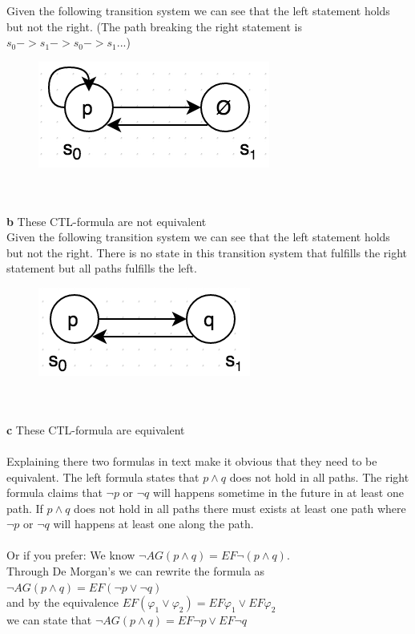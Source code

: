 \documentclass[12pt,oneside,reqno]{amsart}
\begin{document}
Given the following transition system we can see that the left statement holds but not the right. (The path breaking the right statement is $s_0->s_1->s_0->s_1...$)
	\begin{figure}[h]
      	\includegraphics[scale=0.7]{prob3a}
	\end{figure}\\\\
\textbf{b} These CTL-formula are not equivalent\\
Given the following transition system we can see that the left statement holds but not the right. There is no state in this transition system that fulfills the right statement but all paths fulfills the left.
	\begin{figure}[h]
      	\includegraphics[scale=0.7]{prob3b}
	\end{figure}\\\\
\textbf{c} These CTL-formula are equivalent\\\\
Explaining there two formulas in text make it obvious that they need to be equivalent. The left formula states that $p \land q$ does not hold in all paths. The right formula claims that $\neg p$ or $\neg q$ will happens sometime in the future in at least one path. If $p \land q$ does not hold in all paths there must exists at least one path where $\neg p$ or $\neg q$ will happens at least one along the path.\\\\
Or if you prefer:
We know $\neg AG(p \land q) = EF\neg(p \land q)$.\\
Through De Morgan's we can rewrite the formula as $\neg AG(p\land q) = EF(\neg p \lor \neg q)$\\
and by the equivalence $EF(\varphi_1 \lor \varphi_2)=EF\varphi_1 \lor EF\varphi_2$\\ we can state that $\neg AG(p\land q) = EF\neg p\lor EF\neg q$\\
\end{document}
